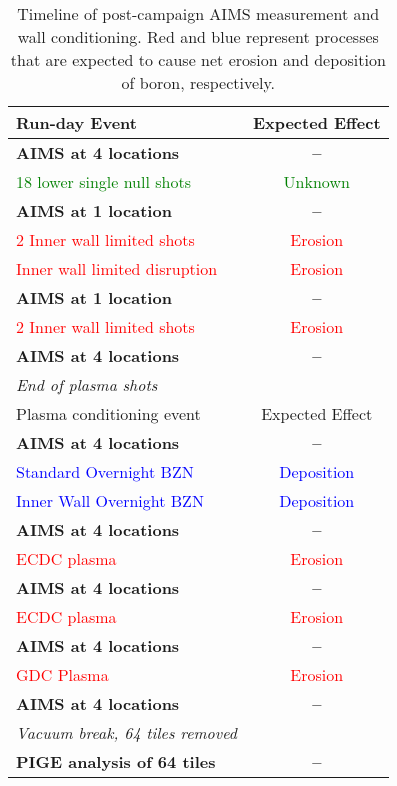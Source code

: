 \documentclass[final,3p,times,twocolumn]{elsarticle}
\begin{document}
%
\begin{table}
 \centering
 \begin{tabular}{|l|c|}
  \hline
  Run-day Event & Expected Effect\\ \hline \hline 
  \textbf{AIMS at 4 locations} & \textbf{--}\\ \hline
  \textcolor{green}{18 lower single null shots} & \textcolor{green}{Unknown} \\
  \textbf{AIMS at 1 location} & \textbf{--}\\
  \textcolor{red}{2 Inner wall limited shots} & \textcolor{red}{Erosion} \\
  \textcolor{red}{Inner wall limited disruption} & \textcolor{red}{Erosion}\\
  \textbf{AIMS at 1 location} & \textbf{--}\\
  \textcolor{red}{2 Inner wall limited shots} & \textcolor{red}{Erosion} \\
  \textbf{AIMS at 4 locations} & \textbf{--}\\
  \textit{End of plasma shots} & \\ \hline \hline
  Plasma conditioning event & Expected Effect \\ \hline \hline
  \textbf{AIMS at 4 locations} & \textbf{--}\\
  \textcolor{blue}{Standard Overnight BZN} & \textcolor{blue}{Deposition} \\
  \textcolor{blue}{Inner Wall Overnight BZN} & \textcolor{blue}{Deposition} \\
  \textbf{AIMS at 4 locations} & \textbf{--}\\
  \textcolor{red}{ECDC plasma} & \textcolor{red}{Erosion} \\
  \textbf{AIMS at 4 locations} & \textbf{--}\\
  \textcolor{red}{ECDC plasma} & \textcolor{red}{Erosion} \\
  \textbf{AIMS at 4 locations} & \textbf{--}\\
  \textcolor{red}{GDC Plasma} & \textcolor{red}{Erosion} \\
  \textbf{AIMS at 4 locations} & \textbf{--}\\
  \textit{Vacuum break, 64 tiles removed} & \\
  \textbf{PIGE analysis of 64 tiles} & \textbf{--}\\ \hline
 \end{tabular}
 \caption{Timeline of post-campaign AIMS measurement and wall conditioning. Red and blue represent processes that are expected to cause net erosion and deposition of boron, respectively.}
 \label{tab:PostCampaignTimeline}
\end{table}
\end{document}
